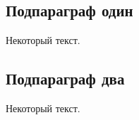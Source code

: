 \subsection{Подпараграф \texorpdfstring{\cyrdash{}}{---} один}\label{sub:ch2/sec3/sub1}

Некоторый текст.

\subsection{Подпараграф \texorpdfstring{\cyrdash{}}{---} два}\label{sub:ch2/sec3/sub2}

Некоторый текст.



\FloatBarrier
